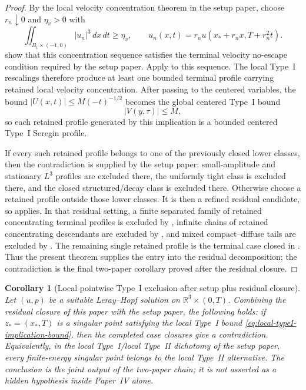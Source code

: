 \documentclass[11pt]{amsart}
\numberwithin{equation}{section}
\theoremstyle{plain}
\newtheorem{corollary}[corollary]{Corollary}
\theoremstyle{definition}
\theoremstyle{remark}
\newcommand{\R}{\mathbb R}
\begin{document}
\begin{proof}
By the local velocity concentration theorem in the setup paper, choose
\(r_n\downarrow0\) and \(\eta_v>0\) with
\[
   \iint_{B_1\times(-1,0)} |u_n|^3\,dx\,dt\ge\eta_v,
   \qquad
   u_n(x,t)=r_nu(x_*+r_nx,T+r_n^2t).
\]
show that this concentration sequence satisfies the terminal
velocity no-escape condition required by the setup paper.
Apply  to this sequence.  The
local Type~I rescalings therefore produce at least one bounded terminal profile
carrying retained local velocity concentration.  After passing to the centered variables, the
bound \(|U(x,t)|\le M(-t)^{-1/2}\) becomes the global centered Type~I bound
\[
   |V(y,\tau)|\le M,
\]
so each retained profile generated by this implication is a bounded centered Type~I
Seregin profile.

If every such retained profile belongs to one of the previously closed lower
classes, then the contradiction is supplied by the setup paper:
small-amplitude and stationary \(L^3\) profiles are excluded there, the
uniformly tight class is excluded there, and the closed structured/decay class
is excluded there.  Otherwise choose a retained profile outside those lower
classes.  It is then a refined residual candidate, so
 applies.  In that residual
setting, a finite separated family of retained concentrating terminal profiles
is excluded by , infinite chains of
retained concentrating descendants are excluded by , and mixed
compact--diffuse tails are excluded by .  The
remaining single retained profile is the terminal case closed in
.  Thus the present theorem supplies the entry into
the residual decomposition; the contradiction is the final two-paper corollary
proved after the residual closure.
\end{proof}

\begin{corollary}[Local pointwise Type~I exclusion after setup plus residual closure]
\label{cor:local-typeI-unconditional}
Let \((u,p)\) be a suitable Leray--Hopf solution on
\(\R^3\times(0,T)\).  Combining the residual closure
 of this paper with
the setup paper, the following holds: if \(z_*=(x_*,T)\) is a singular point
satisfying the local Type~I bound \eqref{eq:local-typeI-implication-bound}, then the
completed case closures give a contradiction.  Equivalently, in the local
Type~I/local Type~II dichotomy of the setup paper, every finite-energy
singular point belongs to the local Type~II alternative.  The conclusion is
the joint output of the two-paper chain; it is not asserted as a hidden
hypothesis inside Paper~IV alone.
\end{corollary}
\end{document}
